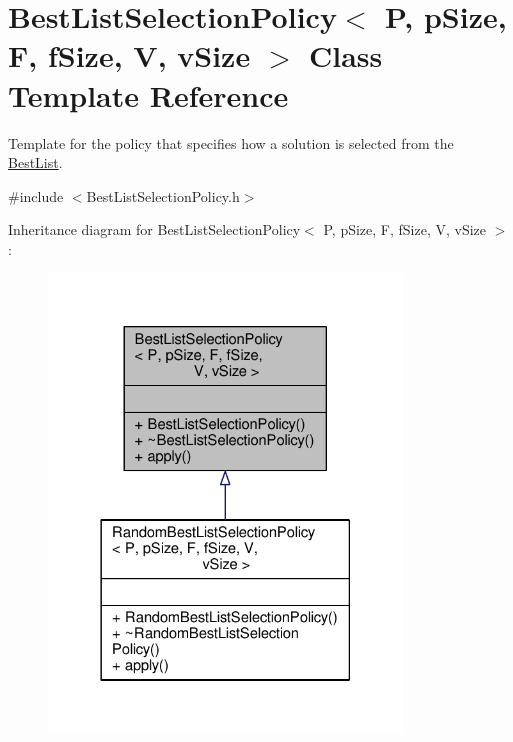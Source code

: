 \hypertarget{classBestListSelectionPolicy}{}\section{Best\+List\+Selection\+Policy$<$ P, p\+Size, F, f\+Size, V, v\+Size $>$ Class Template Reference}
\label{classBestListSelectionPolicy}


Template for the policy that specifies how a solution is selected from the \hyperlink{classBestList}{Best\+List}.  




{\ttfamily \#include $<$Best\+List\+Selection\+Policy.\+h$>$}



Inheritance diagram for Best\+List\+Selection\+Policy$<$ P, p\+Size, F, f\+Size, V, v\+Size $>$\+:
\nopagebreak
\begin{figure}[H]
\begin{center}
\leavevmode
\includegraphics[width=266pt]{classBestListSelectionPolicy__inherit__graph}
\end{center}
\end{figure}


